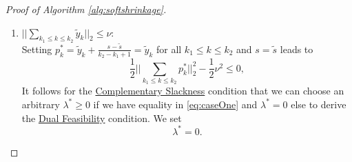 \begin{proof}[Proof of Algorithm \ref{alg:softshrinkage}]
        \begin{enumerate}
            \item $||\sum\limits_{k_{1} \le k \le k_{2}} \tilde{y}_{k}||_{2} \le \nu$:\\
            Setting $p^{\ast}_{k} = \tilde{y}_{k} + \frac{s - \tilde{s}}{k_{2} - k_{1} + 1} = \tilde{y}_{k}$ for all $k_{1} \le k \le k_{2}$ and $s = \tilde{s}$ leads to
                \begin{equation}
                    \frac{1}{2} ||\sum_{k_{1} \le k \le k_{2}} p^{\ast}_{k}||_{2}^{2} - \frac{1}{2} \nu^{2} \le 0, \label{eq:caseOne}
                \end{equation}
            It follows for the \underline{Complementary Slackness} condition that we can choose an arbitrary $\lambda^{\ast} \ge 0$ if we have equality in \ref{eq:caseOne} and $\lambda^{\ast} = 0$ else to derive the \underline{Dual Feasibility} condition. We set
                $$\lambda^{\ast} = 0.$$


\end{enumerate}
\end{proof}
